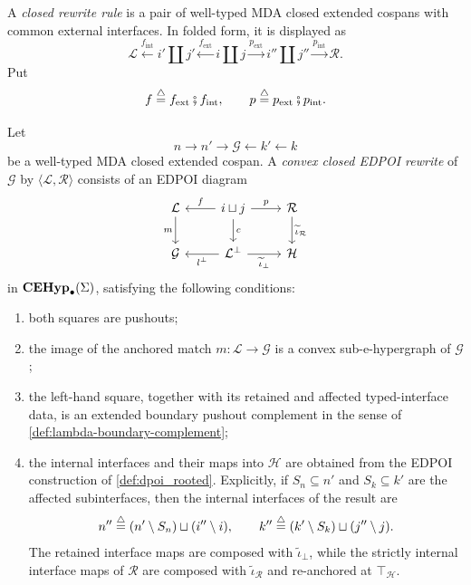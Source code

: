\begin{definition}
\label{def:lambda-convex-edpoi-rewriting}
A \emph{closed rewrite rule} is a pair of well-typed MDA closed
extended cospans with common external interfaces. In folded form, it is
displayed as
\[
  \mathcal L
  \xleftarrow{f_{\mathrm{int}}}
  i'\coprod j'
  \xleftarrow{f_{\mathrm{ext}}}
  i\coprod j
  \xrightarrow{p_{\mathrm{ext}}}
  i''\coprod j''
  \xrightarrow{p_{\mathrm{int}}}
  \mathcal R.
\]
Put
\[
  f
  \stackrel{\triangle}{=}
  f_{\mathrm{ext}}\fatsemi f_{\mathrm{int}},
  \qquad
  p
  \stackrel{\triangle}{=}
  p_{\mathrm{ext}}\fatsemi p_{\mathrm{int}}.
\]

Let
\[
  n
  \longrightarrow
  n'
  \longrightarrow
  \mathcal G
  \longleftarrow
  k'
  \longleftarrow
  k
\]
be a well-typed MDA closed extended cospan. A \emph{convex closed
EDPOI rewrite} of \(\mathcal G\) by
\(\langle\mathcal L,\mathcal R\rangle\) consists of an EDPOI diagram
\[
\begin{tikzcd}
  \mathcal L
    \arrow[d,"m"']
  &
  i\coprod j
    \arrow[l,"f"']
    \arrow[r,"p"]
    \arrow[d,"c"]
  &
  \mathcal R
    \arrow[d,"\widetilde\iota_{\mathcal R}"]
  \\
  \mathcal G
  &
  \mathcal L^\bot
    \arrow[l,"l^\bot"]
    \arrow[r,"\widetilde\iota_{\bot}"']
  &
  \mathcal H
\end{tikzcd}
\]
in \(\mathbf{CEHyp}_{\bullet}(\Sigma)\), satisfying the following
conditions:

\begin{enumerate}
  \item both squares are pushouts;

  \item the image of the anchored match
  \(m:\mathcal L\to\mathcal G\) is a convex sub-e-hypergraph of
  \(\mathcal G\);

  \item the left-hand square, together with its retained and affected
  typed-interface data, is an extended boundary pushout complement in
  the sense of \cref{def:lambda-boundary-complement};

  \item the internal interfaces and their maps into \(\mathcal H\) are
  obtained from the EDPOI construction of \cref{def:dpoi_rooted}.
  Explicitly, if \(S_n\subseteq n'\) and \(S_k\subseteq k'\) are the
  affected subinterfaces, then the internal interfaces of the result
  are
  \[
    n''
    \stackrel{\triangle}{=}
    (n'\setminus S_n)\sqcup(i''\setminus i),
    \qquad
    k''
    \stackrel{\triangle}{=}
    (k'\setminus S_k)\sqcup(j''\setminus j).
  \]
  The retained interface maps are composed with
  \(\widetilde\iota_{\bot}\), while the strictly internal interface
  maps of \(\mathcal R\) are composed with
  \(\widetilde\iota_{\mathcal R}\) and re-anchored at
  \(\top_{\mathcal H}\).
\end{enumerate}


\end{definition}
